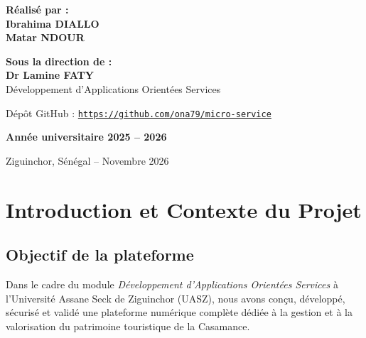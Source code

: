 \documentclass[12pt,a4paper]{report}
\begin{document}
\begin{titlepage}
    \begin{minipage}[t]{0.46\textwidth}
        \raggedright
        {\normalsize\bfseries\color{uaszGreen} Réalisé par :}\\[0.2cm]
        {\large\bfseries Ibrahima \textsc{DIALLO}}\\[0.08cm]
        {\large\bfseries Matar \textsc{NDOUR}}
    \end{minipage}
    \hfill
    \begin{minipage}[t]{0.46\textwidth}
        \raggedleft
        {\normalsize\bfseries\color{uaszGreen} Sous la direction de :}\\[0.2cm]
        {\large\bfseries Dr Lamine \textsc{FATY}}\\[0.08cm]
        {\normalsize Développement d'Applications Orientées Services}
    \end{minipage}

    \vfill
    {\normalsize Dépôt GitHub : \href{https://github.com/ona79/micro-service}{\texttt{https://github.com/ona79/micro-service}}\par}
    \vspace{0.3cm}
    {\large\bfseries\color{uaszDark} Année universitaire 2025 -- 2026\par}
    {\small Ziguinchor, Sénégal -- Novembre 2026\par}
\end{titlepage}

\tableofcontents
\listoffigures
\listoftables
\newpage

\chapter{Introduction et Contexte du Projet}

\section{Objectif de la plateforme}
Dans le cadre du module \emph{Développement d'Applications Orientées Services} à l'Université Assane Seck de Ziguinchor (UASZ), nous avons conçu, développé, sécurisé et validé une plateforme numérique complète dédiée à la gestion et à la valorisation du patrimoine touristique de la Casamance.
\end{document}
